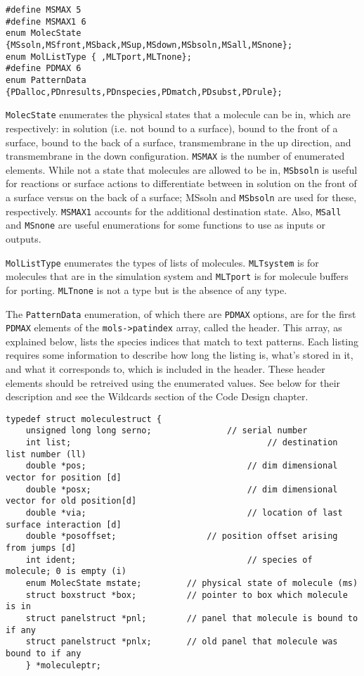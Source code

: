 \documentclass {scrbook}
\newcommand {\ttt} {\texttt}
\begin{document}
\begin{lstlisting}
#define MSMAX 5
#define MSMAX1 6
enum MolecState {MSsoln,MSfront,MSback,MSup,MSdown,MSbsoln,MSall,MSnone};
enum MolListType { ,MLTport,MLTnone};
#define PDMAX 6
enum PatternData {PDalloc,PDnresults,PDnspecies,PDmatch,PDsubst,PDrule};
\end{lstlisting}

\ttt{MolecState} enumerates the physical states that a molecule can be in, which are respectively: in solution (i.e. not bound to a surface), bound to the front of a surface, bound to the back of a surface, transmembrane in the up direction, and transmembrane in the down configuration. \ttt{MSMAX} is the number of enumerated elements. While not a state that molecules are allowed to be in, \ttt{MSbsoln} is useful for reactions or surface actions to differentiate between in solution on the front of a surface versus on the back of a surface; MSsoln and \ttt{MSbsoln} are used for these, respectively. \ttt{MSMAX1} accounts for the additional destination state. Also, \ttt{MSall} and \ttt{MSnone} are useful enumerations for some functions to use as inputs or outputs.

\ttt{MolListType} enumerates the types of lists of molecules. \ttt{MLTsystem} is for molecules that are in the simulation system and \ttt{MLTport} is for molecule buffers for porting. \ttt{MLTnone} is not a type but is the absence of any type.

The \ttt{PatternData} enumeration, of which there are \ttt{PDMAX} options, are for the first \ttt{PDMAX} elements of the \ttt{mols->patindex} array, called the header. This array, as explained below, lists the species indices that match to text patterns. Each listing requires some information to describe how long the listing is, what's stored in it, and what it corresponds to, which is included in the header. These header elements should be retreived using the enumerated values. See below for their description and see the Wildcards section of the Code Design chapter.

\begin{lstlisting}
typedef struct moleculestruct {
	unsigned long long serno;				// serial number
	int list;										// destination list number (ll)
	double *pos;								// dim dimensional vector for position [d]
	double *posx;								// dim dimensional vector for old position[d]
	double *via;								// location of last surface interaction [d]
	double *posoffset;					// position offset arising from jumps [d]
	int ident;									// species of molecule; 0 is empty (i)
	enum MolecState mstate;			// physical state of molecule (ms)
	struct boxstruct *box;			// pointer to box which molecule is in
	struct panelstruct *pnl;		// panel that molecule is bound to if any
	struct panelstruct *pnlx;		// old panel that molecule was bound to if any
	} *moleculeptr;
\end{lstlisting}
\end{document}

